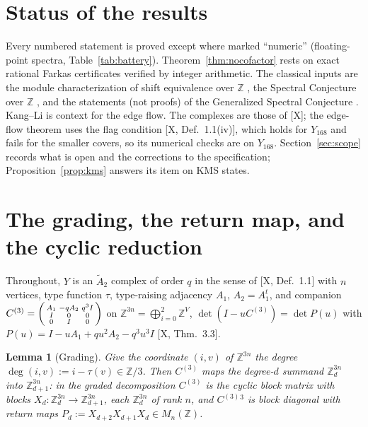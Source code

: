 \documentclass[11pt]{amsart}
\numberwithin{equation}{section}
\newtheorem{lemma}[theorem]{Lemma}
\theoremstyle{definition}
\theoremstyle{remark}
\newcommand{\Z}{\mathbb{Z}}
\newcommand{\Atwo}{\widetilde A_2}
\newcommand{\Cthree}{C^{(3)}}
\begin{document}
\maketitle

\section*{Status of the results}

Every numbered statement is proved except where marked ``numeric'' (floating-point spectra,
Table~\ref{tab:battery}). Theorem~\ref{thm:nocofactor} rests on exact rational Farkas
certificates verified by integer arithmetic. The classical inputs are the module
characterization of shift equivalence over $\Z$ \cite[\S2]{BS}, the Spectral Conjecture over
$\Z$ \cite{KOR}, and the statements (not proofs) of the Generalized Spectral Conjecture
\cite{BH91,BH93,BS}. Kang--Li \cite{KL} is context for the edge flow. The complexes are those
of [X]; the edge-flow theorem uses the flag condition [X, Def.~1.1(iv)], which holds for
$Y_{168}$ and fails for the smaller covers, so its numerical checks are on $Y_{168}$.
Section~\ref{sec:scope} records what is open and the corrections to the specification;
Proposition~\ref{prop:kms} answers its item on KMS states.

\section{The grading, the return map, and the cyclic reduction}\label{sec:grading}

Throughout, $Y$ is an $\Atwo$ complex of order $q$ in the sense of [X, Def.~1.1] with $n$
vertices, type function $\tau$, type-raising adjacency $A_1$, $A_2=A_1^{t}$, and companion
$\Cthree=\begin{psmallmatrix}A_1&-qA_2&q^{3}I\\ I&0&0\\0&I&0\end{psmallmatrix}$ on
$\Z^{3n}=\bigoplus_{i=0}^{2}\Z^{V}$, $\det(I-u\Cthree)=\det P(u)$ with
$P(u)=I-uA_1+qu^{2}A_2-q^{3}u^{3}I$ [X, Thm.~3.3].

\begin{lemma}[Grading]\label{lem:grading}
Give the coordinate $(i,v)$ of $\Z^{3n}$ the degree $\deg(i,v):=i-\tau(v)\in\Z/3$. Then
$\Cthree$ maps the degree-$d$ summand $\Z^{3n}_d$ into $\Z^{3n}_{d+1}$: in the graded
decomposition $\Cthree$ is the cyclic block matrix with blocks $X_d\colon\Z^{3n}_d\to
\Z^{3n}_{d+1}$, each $\Z^{3n}_d$ of rank $n$, and $\Cthree{}^{3}$ is block diagonal with
\emph{return maps} $P_d:=X_{d+2}X_{d+1}X_d\in M_n(\Z)$.
\end{lemma}
\end{document}
